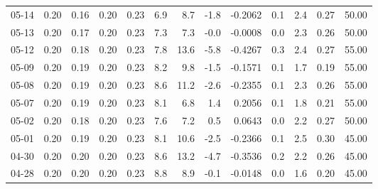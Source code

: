 \begin{threeparttable}
{\begin{tabular}{lrrrrrrrrrrrr}
  05-14 &          0.20 &          0.16 &          0.20 &        0.23 &                 6.9 &                 8.7 &       -1.8 &      -0.2062 &                 0.1 &              2.4 &            0.27 &                  50.00 \\
  05-13 &          0.20 &          0.17 &          0.20 &        0.23 &                 7.3 &                 7.3 &       -0.0 &      -0.0008 &                 0.0 &              2.3 &            0.26 &                  50.00 \\
  05-12 &          0.20 &          0.18 &          0.20 &        0.23 &                 7.8 &                13.6 &       -5.8 &      -0.4267 &                 0.3 &              2.4 &            0.27 &                  55.00 \\
  05-09 &          0.20 &          0.19 &          0.20 &        0.23 &                 8.2 &                 9.8 &       -1.5 &      -0.1571 &                 0.1 &              1.7 &            0.19 &                  55.00 \\
  05-08 &          0.20 &          0.19 &          0.20 &        0.23 &                 8.6 &                11.2 &       -2.6 &      -0.2355 &                 0.1 &              2.3 &            0.26 &                  55.00 \\
  05-07 &          0.20 &          0.19 &          0.20 &        0.23 &                 8.1 &                 6.8 &        1.4 &       0.2056 &                 0.1 &              1.8 &            0.21 &                  55.00 \\
  05-02 &          0.20 &          0.18 &          0.20 &        0.23 &                 7.6 &                 7.2 &        0.5 &       0.0643 &                 0.0 &              2.2 &            0.27 &                  50.00 \\
  05-01 &          0.20 &          0.19 &          0.20 &        0.23 &                 8.1 &                10.6 &       -2.5 &      -0.2366 &                 0.1 &              2.5 &            0.30 &                  45.00 \\
  04-30 &          0.20 &          0.20 &          0.20 &        0.23 &                 8.6 &                13.2 &       -4.7 &      -0.3536 &                 0.2 &              2.2 &            0.26 &                  45.00 \\
  04-28 &          0.20 &          0.20 &          0.20 &        0.23 &                 8.8 &                 8.9 &       -0.1 &      -0.0148 &                 0.0 &              1.6 &            0.20 &                  45.00 \\

\end{tabular}}
\end{threeparttable}
